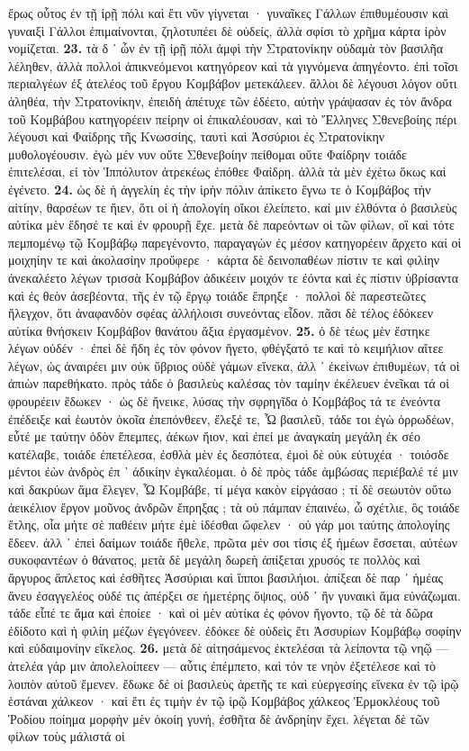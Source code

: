 \documentclass[a4paper, 11pt, oneside, polutonikogreek, german]{article}
\begin{document}
ἔρως οὗτος ἐν τῇ ἱρῇ πόλι καὶ ἔτι νῦν γίγνεται · γυναῖκες Γάλλων ἐπιθυμέουσιν καὶ γυναιξὶ Γάλλοι ἐπιμαίνονται, ζηλοτυπέει δὲ οὐδείς, ἀλλὰ σφίσι τὸ χρῆμα κάρτα ἱρὸν νομίζεται. \textbf{23.} τὰ δ ᾽ ὦν ἐν τῇ ἱρῇ πόλι ἀμφὶ τὴν Στρατονίκην οὐδαμὰ τὸν βασιλῆα λέληθεν, ἀλλὰ πολλοὶ ἀπικνεόμενοι κατηγόρεον καὶ τὰ γιγνόμενα ἀπηγέοντο. ἐπὶ τοῖσι περιαλγέων ἐξ ἀτελέος τοῦ ἔργου Κομβάβον μετεκάλεεν. ἄλλοι δὲ λέγουσι λόγον οὔτι ἀληθέα, τὴν Στρατονίκην, ἐπειδὴ ἀπέτυχε τῶν ἐδέετο, αὐτὴν γράψασαν ἐς τὸν ἄνδρα τοῦ Κομβάβου κατηγορέειν πείρην οἱ ἐπικαλέουσαν, καὶ τὸ Ἕλληνες Σθενεβοίης πέρι λέγουσι καὶ Φαίδρης τῆς Κνωσσίης, ταυτὶ καὶ Ἀσσύριοι ἐς Στρατονίκην μυθολογέουσιν. ἐγὼ μέν νυν οὔτε Σθενεβοίην πείθομαι οὔτε Φαίδρην τοιάδε ἐπιτελέσαι, εἰ τὸν Ἱππόλυτον ἀτρεκέως ἐπόθεε Φαίδρη. ἀλλὰ τὰ μὲν ἐχέτω ὅκως καὶ ἐγένετο. \textbf{24.} ὡς δὲ ἡ ἀγγελίη ἐς τὴν ἱρὴν πόλιν ἀπίκετο ἔγνω τε ὁ Κομβάβος τὴν αἰτίην, θαρσέων τε ἤιεν, ὅτι οἱ ἡ ἀπολογίη οἴκοι ἐλείπετο, καί μιν ἐλθόντα ὁ βασιλεὺς αὐτίκα μὲν ἔδησέ τε καὶ ἐν φρουρῇ ἔχε. μετὰ δὲ παρεόντων οἱ τῶν φίλων, οἳ καὶ τότε πεμπομένῳ τῷ Κομβάβῳ παρεγένοντο, παραγαγὼν ἐς μέσον κατηγορέειν ἄρχετο καί οἱ μοιχηίην τε καὶ ἀκολασίην προὔφερε · κάρτα δὲ δεινοπαθέων πίστιν τε καὶ φιλίην ἀνεκαλέετο λέγων τρισσὰ Κομβάβον ἀδικέειν μοιχόν τε ἐόντα καὶ ἐς πίστιν ὑβρίσαντα καὶ ἐς θεὸν ἀσεβέοντα, τῆς ἐν τῷ ἔργῳ τοιάδε ἔπρηξε · πολλοὶ δὲ παρεστεῶτες ἤλεγχον, ὅτι ἀναφανδὸν σφέας ἀλλήλοισι συνεόντας εἶδον. πᾶσι δὲ τέλος ἐδόκεεν αὐτίκα θνήσκειν Κομβάβον θανάτου ἄξια ἐργασμένον. \textbf{25.} ὁ δὲ τέως μὲν ἕστηκε λέγων οὐδέν · ἐπεὶ δὲ ἤδη ἐς τὸν φόνον ἤγετο, φθέγξατό τε καὶ τὸ κειμήλιον αἴτεε λέγων, ὡς ἀναιρέει μιν οὐκ ὕβριος οὐδὲ γάμων εἵνεκα, ἀλλ ᾽ ἐκείνων ἐπιθυμέων, τά οἱ ἀπιὼν παρεθήκατο. πρὸς τάδε ὁ βασιλεὺς καλέσας τὸν ταμίην ἐκέλευεν ἐνεῖκαι τά οἱ φρουρέειν ἔδωκεν · ὡς δὲ ἤνεικε, λύσας τὴν σφρηγῖδα ὁ Κομβάβος τά τε ἐνεόντα ἐπέδειξε καὶ ἑωυτὸν ὁκοῖα ἐπεπόνθεεν, ἔλεξέ τε, Ὦ βασιλεῦ, τάδε τοι ἐγὼ ὀρρωδέων, εὖτέ με ταύτην ὁδὸν ἔπεμπες, ἀέκων ἤιον, καὶ ἐπεί με ἀναγκαίη μεγάλη ἐκ σέο κατέλαβε, τοιάδε ἐπετέλεσα, ἐσθλὰ μὲν ἐς δεσπότεα, ἐμοὶ δὲ οὐκ εὐτυχέα · τοιόσδε μέντοι ἐὼν ἀνδρὸς ἐπ ᾽ ἀδικίην ἐγκαλέομαι. ὁ δὲ πρὸς τάδε ἀμβώσας περιέβαλέ τέ μιν καὶ δακρύων ἅμα ἔλεγεν, Ὦ Κομβάβε, τί μέγα κακὸν εἰργάσαο ; τί δὲ σεωυτὸν οὕτω ἀεικέλιον ἔργον μοῦνος ἀνδρῶν ἔπρηξας ; τὰ οὐ πάμπαν ἐπαινέω, ὦ σχέτλιε, ὃς τοιάδε ἔτλης, οἷα μήτε σὲ παθέειν μήτε ἐμὲ ἰδέσθαι ὤφελεν · οὐ γάρ μοι ταύτης ἀπολογίης ἔδεεν. ἀλλ ᾽ ἐπεὶ δαίμων τοιάδε ἤθελε, πρῶτα μέν σοι τίσις ἐξ ἡμέων ἔσσεται, αὐτέων συκοφαντέων ὁ θάνατος, μετὰ δὲ μεγάλη δωρεὴ ἀπίξεται χρυσός τε πολλὸς καὶ ἄργυρος ἄπλετος καὶ ἐσθῆτες Ἀσσύριαι καὶ ἵπποι βασιλήιοι. ἀπίξεαι δὲ παρ ᾽ ἡμέας ἄνευ ἐσαγγελέος οὐδέ τις ἀπέρξει σε ἡμετέρης ὄψιος, οὐδ ᾽ ἢν γυναικὶ ἅμα εὐνάζωμαι. τάδε εἶπέ τε ἅμα καὶ ἐποίεε · καὶ οἱ μὲν αὐτίκα ἐς φόνον ἤγοντο, τῷ δὲ τὰ δῶρα ἐδίδοτο καὶ ἡ φιλίη μέζων ἐγεγόνεεν. ἐδόκεε δὲ οὐδεὶς ἔτι Ἀσσυρίων Κομβάβῳ σοφίην καὶ εὐδαιμονίην εἴκελος. \textbf{26.} μετὰ δὲ αἰτησάμενος ἐκτελέσαι τὰ λείποντα τῷ νηῷ --- ἀτελέα γάρ μιν ἀπολελοίπεεν --- αὖτις ἐπέμπετο, καὶ τόν τε νηὸν ἐξετέλεσε καὶ τὸ λοιπὸν αὐτοῦ ἔμενεν. ἔδωκε δέ οἱ βασιλεὺς ἀρετῆς τε καὶ εὐεργεσίης εἵνεκα ἐν τῷ ἱρῷ ἑστάναι χάλκεον · καὶ ἔτι ἐς τιμὴν ἐν τῷ ἱρῷ Κομβάβος χάλκεος Ἑρμοκλέους τοῦ Ῥοδίου ποίημα μορφὴν μὲν ὁκοίη γυνή, ἐσθῆτα δὲ ἀνδρηίην ἔχει. λέγεται δὲ τῶν φίλων τοὺς μάλιστά οἱ 
\end{document}
